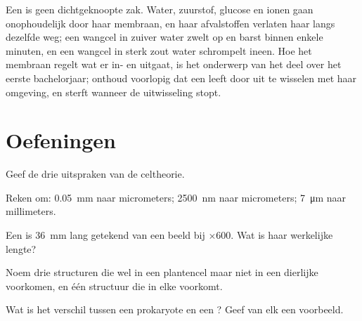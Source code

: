 \begin{remark}\label{rem:g10:cells-common-unit:open}
Een  is geen dichtgeknoopte zak. Water, zuurstof, glucose en ionen
gaan onophoudelijk door haar membraan, en haar afvalstoffen verlaten
haar langs dezelfde weg; een wangcel in zuiver water zwelt op en barst
binnen enkele minuten, en een wangcel in sterk zout water schrompelt
ineen. Hoe het membraan regelt wat er in- en uitgaat, is het onderwerp
van het deel over het eerste bachelorjaar; onthoud voorlopig dat een 
leeft door uit te wisselen met haar omgeving, en sterft wanneer de
uitwisseling stopt.
\end{remark}

\section{Oefeningen}

\begin{exercise}[$\star$]\label{exo:g10:cells-common-unit:1}
Geef de drie uitspraken van de celtheorie.
\end{exercise}

\begin{exercise}[$\star$]\label{exo:g10:cells-common-unit:2}
Reken om: \qty{0.05}{mm} naar micrometers; \qty{2500}{nm} naar
micrometers; \qty{7}{\micro m} naar millimeters.
\end{exercise}

\begin{exercise}[$\star$]\label{exo:g10:cells-common-unit:3}
Een  is \qty{36}{mm} lang getekend van een beeld bij $\times 600$.
Wat is haar werkelijke lengte?
\end{exercise}

\begin{exercise}[$\star$]\label{exo:g10:cells-common-unit:4}
Noem drie structuren die wel in een plantencel maar niet in een
dierlijke  voorkomen, en één structuur die in elke  voorkomt.
\end{exercise}

\begin{exercise}[$\star$]\label{exo:g10:cells-common-unit:5}
Wat is het verschil tussen een prokaryote en een ? Geef van
elk een voorbeeld.
\end{exercise}


